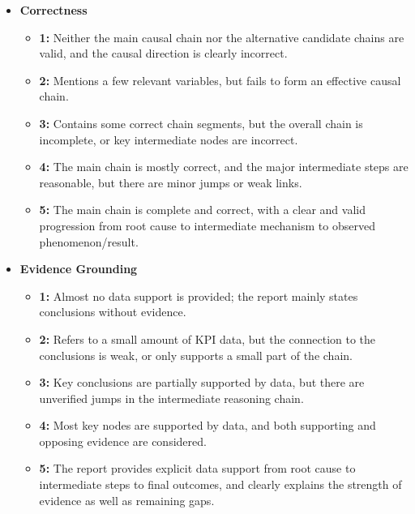 \documentclass[sigconf,10pt]{acmart} %
\begin{document}
\begin{itemize}[itemsep=0em, topsep=0em, leftmargin=1em]
    \item \textbf{Correctness}
    \begin{itemize}[itemsep=0em, topsep=0em, leftmargin=1em]
        \item \textbf{1:} Neither the main causal chain nor the alternative candidate chains are valid, and the causal direction is clearly incorrect.
        \item \textbf{2:} Mentions a few relevant variables, but fails to form an effective causal chain.
        \item \textbf{3:} Contains some correct chain segments, but the overall chain is incomplete, or key intermediate nodes are incorrect.
        \item \textbf{4:} The main chain is mostly correct, and the major intermediate steps are reasonable, but there are minor jumps or weak links.
        \item \textbf{5:} The main chain is complete and correct, with a clear and valid progression from root cause to intermediate mechanism to observed phenomenon/result.
    \end{itemize}

    \item \textbf{Evidence Grounding}
    \begin{itemize}[itemsep=0em, topsep=0em, leftmargin=1em]
        \item \textbf{1:} Almost no data support is provided; the report mainly states conclusions without evidence.
        \item \textbf{2:} Refers to a small amount of KPI data, but the connection to the conclusions is weak, or only supports a small part of the chain.
        \item \textbf{3:} Key conclusions are partially supported by data, but there are unverified jumps in the intermediate reasoning chain.
        \item \textbf{4:} Most key nodes are supported by data, and both supporting and opposing evidence are considered.
        \item \textbf{5:} The report provides explicit data support from root cause to intermediate steps to final outcomes, and clearly explains the strength of evidence as well as remaining gaps.
    \end{itemize}


\end{itemize}
\end{document}

